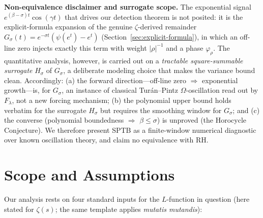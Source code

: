 \medskip
\noindent\textbf{Non-equivalence disclaimer and surrogate scope.}
The exponential signal $e^{(\beta-\sigma)t}\cos(\gamma t)$ that drives our
detection theorem is not posited: it is the explicit-formula expansion of the
genuine $\zeta$-derived remainder $G_\sigma(t)=e^{-\sigma t}(\psi(e^t)-e^t)$
(Section~\ref{sec:explicit-formula}), in which an off-line zero injects exactly
this term with weight $|\rho|^{-1}$ and a phase $\varphi_\rho$. The quantitative
analysis, however, is carried out on a \emph{tractable square-summable surrogate}
$H_\sigma$ of $G_\sigma$, a deliberate modeling choice that makes the variance
bound clean. Accordingly: (a) the forward direction---off-line zero
$\Rightarrow$ exponential growth---is, for $G_\sigma$, an instance of classical
Tur\'an--Pintz $\Omega$-oscillation read out by $F_\lambda$, not a new forcing
mechanism; (b) the polynomial upper bound holds verbatim for the surrogate
$H_\sigma$ but requires the smoothing window for $G_\sigma$; and (c) the
converse (polynomial boundedness $\Rightarrow$ $\beta\le\sigma$) is unproved (the
Horocycle Conjecture). We therefore present SPTB as a finite-window numerical
diagnostic over known oscillation theory, and claim no equivalence with RH.

\section{Scope and Assumptions}

Our analysis rests on four standard inputs for the $L$-function in question
(here stated for $\zeta(s)$; the same template applies \emph{mutatis mutandis}):

